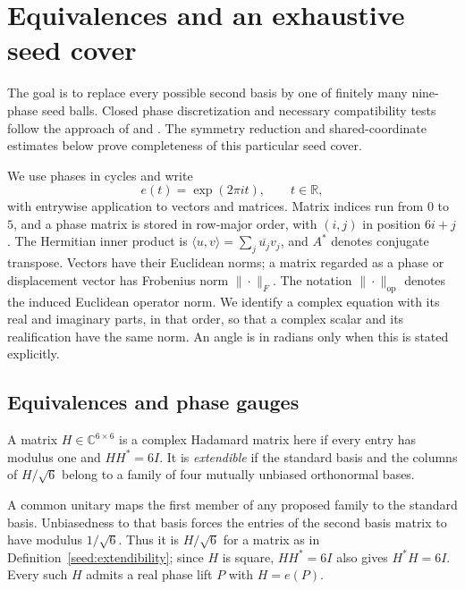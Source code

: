 \section{Equivalences and an exhaustive seed cover}
\label{sec:seed}

The goal is to replace every possible second basis by one of finitely
many nine-phase seed balls. Closed phase discretization and necessary
compatibility tests follow the approach of
\cite[Section~3]{JamingEtAl2009} and
\cite[Sections~2--3]{JamingMatolcsiMora2010}. The symmetry reduction and
shared-coordinate estimates below prove completeness of this particular
seed cover.

We use phases in cycles and write
\[
 e(t)=\exp(2\pi i t),\qquad t\in\mathbb R,
\]
with entrywise application to vectors and matrices.  Matrix indices run from
$0$ to $5$, and a phase matrix is stored in row-major order, with $(i,j)$
in position $6i+j$.  The Hermitian inner product is
$\langle u,v\rangle=\sum_j\overline{u_j}v_j$, and $A^*$ denotes conjugate
transpose.  Vectors have their Euclidean norms; a matrix regarded as a phase
or displacement vector has Frobenius norm $\|\cdot\|_F$.  The notation
$\|\cdot\|_{\mathrm{op}}$ denotes the induced Euclidean operator norm.
We identify a complex equation with its real and imaginary parts, in that
order, so that a complex scalar and its realification have the same norm.
An angle is in radians only when this is stated explicitly.

\subsection{Equivalences and phase gauges}

\begin{definition}
\label{seed:extendibility}
A matrix $H\in\mathbb C^{6\times6}$ is a complex Hadamard matrix here if
every entry has modulus one and $HH^*=6I$.  It is \emph{extendible} if the
standard basis and the columns of $H/\sqrt6$ belong to a family of four
mutually unbiased orthonormal bases.
\end{definition}

A common unitary maps the first member of any proposed family to the
standard basis.  Unbiasedness to that basis forces the entries of the second
basis matrix to have modulus $1/\sqrt6$.  Thus it is $H/\sqrt6$ for a matrix
as in Definition~\ref{seed:extendibility}; since $H$ is square, $HH^*=6I$
also gives $H^*H=6I$.  Every such $H$ admits a real phase lift $P$ with
$H=e(P)$.

